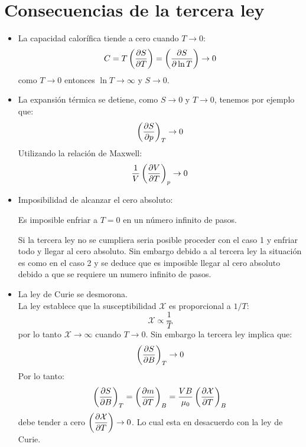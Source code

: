 \documentclass[../main]{subfiles}
\begin{document}
\section{Consecuencias de la tercera ley}
\begin{itemize}
    \item La capacidad calorífica tiende a cero cuando $T\rightarrow 0$:
    \begin{equation}
        C=T \left( \pdv{S}{T}\right)=\left(\pdv{S}{\ln{T}}\right)\rightarrow 0
    \end{equation}
    como $T \rightarrow 0$ entonces $\ln{T}\rightarrow \infty$ y $S \rightarrow 0$.
    \item La expansión térmica se detiene, como $S \rightarrow 0$ y $T \rightarrow 0$, tenemos por ejemplo que:
    \begin{equation}
        \left( \pdv{S}{p}\right)_T \rightarrow 0
    \end{equation}
    Utilizando la relación de Maxwell:
    \begin{equation}
        \dfrac{1}{V}\left( \pdv{V}{T}\right)_p \rightarrow 0
    \end{equation}
    \item Imposibilidad de alcanzar el cero absoluto:
    \begin{center}
        Es imposible enfriar a $T=0$ en un número infinito de pasos.
    \end{center}
    Si la tercera ley no se cumpliera seria posible proceder con el caso 1 y enfriar todo y llegar al cero absoluto. Sin embargo debido a al tercera ley la situación es como en el caso 2 y se deduce que es imposible llegar al cero absoluto debido a que se requiere un numero infinito de pasos.
    \item La ley de Curie se desmorona. \\[0.3cm]
    La ley establece que la susceptibilidad $\mathcal{X}$ es proporcional a $1/T$:
    \begin{equation}
        \mathcal{X}\propto \dfrac{1}{T}
    \end{equation}
    por lo tanto $\mathcal{X} \rightarrow \infty$ cuando $T\rightarrow 0$. Sin embargo la tercera ley implica que:
    \begin{equation}
        \left( \pdv{S}{B}\right)_T \rightarrow 0
    \end{equation}
    Por lo tanto:
    \begin{equation}
        \left( \pdv{S}{B}\right)_T=\left( \pdv{m}{T}\right)_B=\dfrac{VB}{\mu_0} \left( \pdv{\mathcal{X}}{T}\right)_B
    \end{equation}
    debe tender a cero $\displaystyle \left( \pdv{\mathcal{X}}{T}\right)\rightarrow 0$. Lo cual esta en desacuerdo con la ley de Curie.
\end{itemize}
\end{document}
